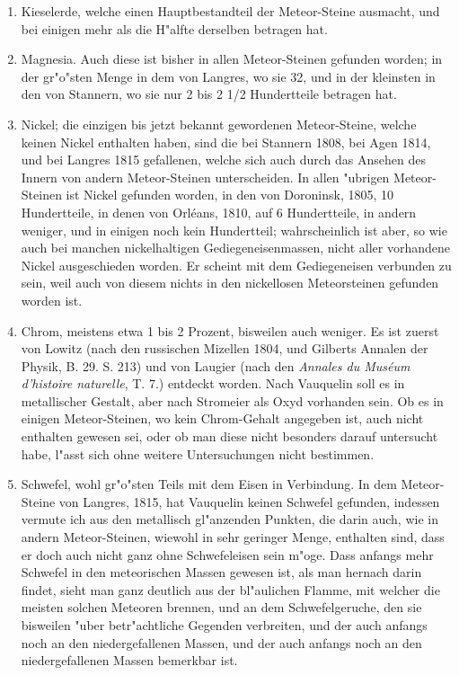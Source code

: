 \documentclass[a4paper, 11pt, oneside, polutonikogreek, german]{article}
\begin{document}
\begin{enumerate}
\begin{enumerate}
   \end{enumerate}
  \item Kieselerde, welche einen Hauptbestandteil der Meteor-Steine ausmacht, und bei einigen mehr als die H"alfte derselben betragen hat.
  \item Magnesia. Auch diese ist bisher in allen Meteor-Steinen gefunden worden; in der gr"o"sten Menge in dem von Langres, wo sie 32, und in der kleinsten in den von Stannern, wo sie nur 2 bis 2 1/2 Hundertteile betragen hat.
  \item Nickel; die einzigen bis jetzt bekannt gewordenen Meteor-Steine, welche keinen Nickel enthalten haben, sind die bei Stannern 1808, bei Agen 1814, und bei Langres 1815 gefallenen, welche sich auch durch das Ansehen des Innern von andern Meteor-Steinen unterscheiden. In allen "ubrigen Meteor-Steinen ist Nickel gefunden worden, in den von Doroninsk, 1805, 10 Hundertteile, in denen von Orléans, 1810, auf 6 Hundertteile, in andern weniger, und in einigen noch kein Hundertteil; wahrscheinlich ist aber, so wie auch bei manchen nickelhaltigen Gediegeneisenmassen, nicht aller vorhandene Nickel ausgeschieden worden. Er scheint mit dem Gediegeneisen verbunden zu sein, weil auch von diesem nichts in den nickellosen Meteorsteinen gefunden worden ist.
  \item Chrom, meistens etwa 1 bis 2 Prozent, bisweilen auch weniger. Es ist zuerst von Lowitz (nach den russischen Mizellen 1804, und Gilberts Annalen der Physik, B. 29. S. 213) und von Laugier (nach den \emph{Annales du Muséum d'histoire naturelle}, T. 7.) entdeckt worden. Nach Vauquelin soll es in metallischer Gestalt, aber nach Stromeier als Oxyd vorhanden sein. Ob es in einigen Meteor-Steinen, wo kein Chrom-Gehalt angegeben ist, auch nicht enthalten gewesen sei, oder ob man diese nicht besonders darauf untersucht habe, l"asst sich ohne weitere Untersuchungen nicht bestimmen.
  \item Schwefel, wohl gr"o"sten Teils mit dem Eisen in Verbindung. In dem Meteor-Steine von Langres, 1815, hat Vauquelin keinen Schwefel gefunden, indessen vermute ich aus den metallisch gl"anzenden Punkten, die darin auch, wie in andern Meteor-Steinen, wiewohl in sehr geringer Menge, enthalten sind, dass er doch auch nicht ganz ohne Schwefeleisen sein m"oge. Dass anfangs mehr Schwefel in den meteorischen Massen gewesen ist, als man hernach darin findet, sieht man ganz deutlich aus der bl"aulichen Flamme, mit welcher die meisten solchen Meteoren brennen, und an dem Schwefelgeruche, den sie bisweilen "uber betr"achtliche Gegenden verbreiten, und der auch anfangs noch an den niedergefallenen Massen, und der auch anfangs noch an den niedergefallenen Massen bemerkbar ist.

\end{enumerate}
\end{document}

